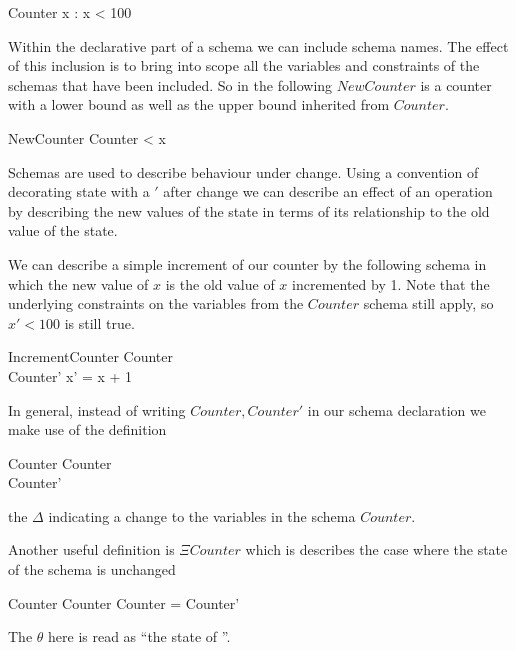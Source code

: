 \begin{schema}{Counter}
x : \nat
\where
x < 100
\end{schema} 

Within the declarative part of a schema we can include schema
names. The effect of this inclusion is to bring into scope all the
variables and constraints of the schemas that have been included.
So in the following $NewCounter$ is a counter with a lower bound as
well as the upper bound inherited from $Counter$.

\begin{schema}{NewCounter}
        Counter
 < x
\end{schema}

Schemas are used to describe behaviour under change. Using a
convention of decorating state with a $'$ after change we can describe an
effect of an operation by describing the new values of the state in
terms of its relationship to
the old value of the state.  

We can describe a simple increment
of our counter by the following schema in which the new value of $x$
is the old value of $x$ incremented by 1. Note that the underlying
constraints on the variables from the $Counter$ schema still apply, so
$x' < 100$ is still true.
\begin{schema}{IncrementCounter}
        Counter
\\      Counter'
\where
x' = x + 1
\end{schema}

In general, instead of writing $Counter, Counter'$ in our schema declaration we
make use of the definition
\begin{schema}{\Delta Counter}
        Counter
\\      Counter'
\end{schema}

the $\Delta$ indicating a change to the variables in the schema $Counter$.

Another useful definition is $\Xi Counter$ which is describes the case
where the state of the schema is unchanged
\begin{schema}{\Xi Counter}
        \Delta Counter
\where
        \theta Counter = \theta Counter'
\end{schema} 
\begin{Zcomment}
\item
The $\theta$ here is read as ``the state of ''.
\end{Zcomment}

